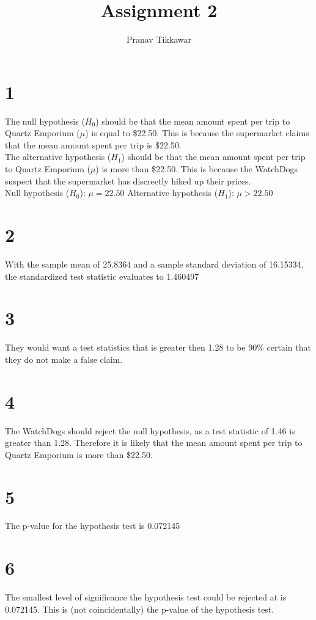 \documentclass{article}
\author{Pranav Tikkawar}
\title{Assignment 2}
\begin{document}
\maketitle
\section*{1}
The null hypothesis ($H_0$) should be that the mean amount spent per trip to Quartz Emporium ($\mu$) is equal to \$22.50. This is because the supermarket claims that the mean amount spent per trip is \$22.50. \\

The alternative hypothesis ($H_1$) should be that the mean amount spent per trip to Quartz Emporium ($\mu$) is more than \$22.50. This is because the WatchDogs suspect that the supermarket has discreetly hiked up their prices. \\

Null hypothesis ($H_0$): $\mu = 22.50$
Alternative hypothesis ($H_1$): $\mu > 22.50$
\section*{2}
With the sample mean of 25.8364 and a sample standard deviation of 16.15334, the standardized test statistic evaluates to 1.460497

\section*{3}
They would want a test statistics that is greater then 1.28 to be 90\% certain that they do not make a false claim.

\section*{4}
The WatchDogs should reject the null hypothesis, as a test statistic of 1.46 is greater than 1.28. Therefore it is likely that the mean amount spent per trip to Quartz Emporium is more than \$22.50.

\section*{5}
The p-value for the hypothesis test is 0.072145

\section*{6}
The smallest level of significance the hypothesis test could be rejected at is 0.072145. This is (not coincidentally) the p-value of the hypothesis test.
\end{document}
